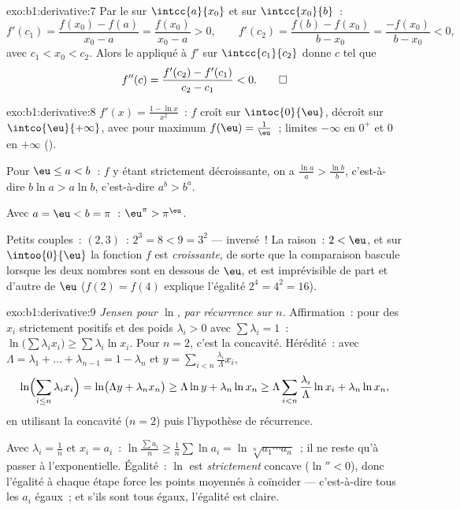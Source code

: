 \begin{solution}{exo:b1:derivative:7}
Par le  sur $\intcc{a}{x_0}$ et sur
$\intcc{x_0}{b}$~:
\[
f'(c_1) = \frac{f(x_0) - f(a)}{x_0 - a} = \frac{f(x_0)}{x_0 - a} > 0,
\qquad
f'(c_2) = \frac{f(b) - f(x_0)}{b - x_0} = \frac{-f(x_0)}{b - x_0} < 0,
\]
avec $c_1 < x_0 < c_2$. Alors le  appliqué à $f'$
sur $\intcc{c_1}{c_2}$ donne $c$ tel que
\[
f''(c) = \frac{f'(c_2) - f'(c_1)}{c_2 - c_1} < 0 . \qedhere
\]
\end{solution}

\begin{solution}{exo:b1:derivative:8}
$f'(x) = \frac{1 - \ln x}{x^2}$~: $f$ croît sur $\intoc{0}{\eu}$,
décroît sur $\intco{\eu}{+\infty}$, avec pour maximum $f(\eu) =
\frac1\eu$~; limites $-\infty$ en $0^+$ et $0$ en $+\infty$ ().

Pour $\eu \leq a < b$~: $f$ y étant strictement décroissante, on a
$\frac{\ln a}{a} > \frac{\ln b}{b}$, c'est-à-dire $b \ln a > a \ln b$,
c'est-à-dire $a^b > b^a$.

Avec $a = \eu < b = \pi$~: $\eu^\pi > \pi^\eu$.

Petits couples~: $(2, 3)$~: $2^3 = 8 < 9 = 3^2$ --- inversé~! La raison~:
$2 < \eu$, et sur $\intoo{0}{\eu}$ la fonction $f$ est
\emph{croissante}, de sorte que la comparaison bascule lorsque les deux nombres sont
en dessous de $\eu$, et est imprévisible de part et d'autre de $\eu$ ($f(2) = f(4)$
explique l'égalité $2^4 = 4^2 = 16$).
\end{solution}

\begin{solution}{exo:b1:derivative:9}
\emph{Jensen pour $\ln$, par récurrence sur $n$.} Affirmation~: pour des
$x_i$ strictement positifs et des poids $\lambda_i > 0$ avec $\sum \lambda_i = 1$~:
$\ln\bigl(\sum \lambda_i x_i\bigr) \geq \sum \lambda_i \ln x_i$. Pour
$n = 2$, c'est la concavité. Hérédité~: avec $\Lambda = \lambda_1 + \dots +
\lambda_{n-1} = 1 - \lambda_n$ et $y = \sum_{i<n}
\frac{\lambda_i}{\Lambda} x_i$,
\[
\ln\Bigl(\sum_{i \leq n} \lambda_i x_i\Bigr)
= \ln\bigl(\Lambda y + \lambda_n x_n\bigr)
\geq \Lambda \ln y + \lambda_n \ln x_n
\geq \Lambda \sum_{i<n} \frac{\lambda_i}{\Lambda}\ln x_i
+ \lambda_n \ln x_n,
\]
en utilisant la concavité ($n = 2$) puis l'hypothèse de récurrence.

Avec $\lambda_i = \frac 1n$ et $x_i = a_i$~: $\ln\frac{\sum a_i}{n}
\geq \frac 1n \sum \ln a_i = \ln\sqrt[n]{a_1\cdots a_n}$~;
il ne reste qu'à passer à l'exponentielle. Égalité~: $\ln$ est \emph{strictement} concave ($\ln'' < 0$),
donc l'égalité à chaque étape force les points moyennés à coïncider ---
c'est-à-dire tous les $a_i$ égaux~; et s'ils sont tous égaux, l'égalité est claire.
\end{solution}

